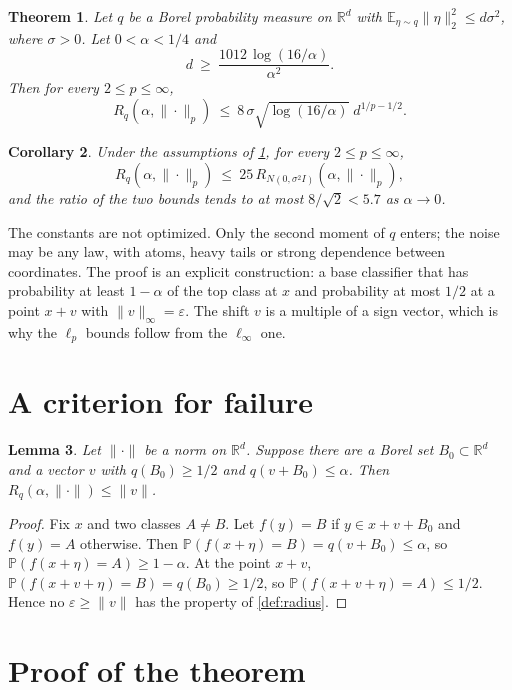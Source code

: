 \documentclass[11pt]{amsart}
\newtheorem{theorem}{Theorem}[section]
\newtheorem{lemma}[theorem]{Lemma}
\newtheorem{corollary}[theorem]{Corollary}
\theoremstyle{definition}
\theoremstyle{remark}
\newcommand{\E}{\mathbb{E}}
\newcommand{\PP}{\mathbb{P}}
\newcommand{\R}{\mathbb{R}}
\newcommand{\Rad}{R}
\begin{document}
\begin{theorem}\label{thm:main}
Let $q$ be a Borel probability measure on $\R^d$ with $\E_{\eta\sim q}\|\eta\|_2^2\le d\sigma^2$, where
$\sigma>0$. Let $0<\alpha<1/4$ and
\[
d\ \ge\ \frac{1012\,\log(16/\alpha)}{\alpha^{2}} .
\]
Then for every $2\le p\le\infty$,
\[
\Rad_q(\alpha,\|\cdot\|_p)\ \le\ 8\,\sigma\sqrt{\log(16/\alpha)}\;d^{1/p-1/2}.
\]
\end{theorem}

\begin{corollary}\label{cor:gauss}
Under the assumptions of \cref{thm:main}, for every $2\le p\le\infty$,
\[
\Rad_q(\alpha,\|\cdot\|_p)\ \le\ 25\,\Rad_{N(0,\sigma^2I)}(\alpha,\|\cdot\|_p),
\]
and the ratio of the two bounds tends to at most $8/\sqrt2<5.7$ as $\alpha\to0$.
\end{corollary}

The constants are not optimized. Only the second moment of $q$ enters; the noise may be any law, with atoms,
heavy tails or strong dependence between coordinates. The proof is an explicit construction: a base
classifier that has probability at least $1-\alpha$ of the top class at $x$ and probability at most $1/2$ at a
point $x+v$ with $\|v\|_\infty=\varepsilon$. The shift $v$ is a multiple of a sign vector, which is why the
$\ell_p$ bounds follow from the $\ell_\infty$ one.

\section{A criterion for failure}

\begin{lemma}\label{lem:criterion}
Let $\|\cdot\|$ be a norm on $\R^d$. Suppose there are a Borel set $B_0\subset\R^d$ and a vector $v$ with
$q(B_0)\ge1/2$ and $q(v+B_0)\le\alpha$. Then $\Rad_q(\alpha,\|\cdot\|)\le\|v\|$.
\end{lemma}

\begin{proof}
Fix $x$ and two classes $A\ne B$. Let $f(y)=B$ if $y\in x+v+B_0$ and $f(y)=A$ otherwise. Then
$\PP(f(x+\eta)=B)=q(v+B_0)\le\alpha$, so $\PP(f(x+\eta)=A)\ge1-\alpha$. At the point $x+v$,
$\PP(f(x+v+\eta)=B)=q(B_0)\ge1/2$, so $\PP(f(x+v+\eta)=A)\le1/2$. Hence no $\varepsilon\ge\|v\|$ has the
property of \cref{def:radius}.
\end{proof}

\section{Proof of the theorem}
\end{document}
